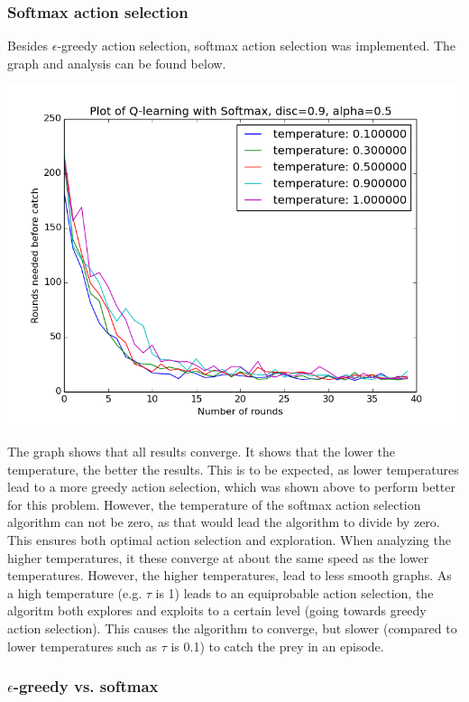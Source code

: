 \documentclass{article}
\begin{document}
\subsubsection{Softmax action selection}
Besides $\epsilon$-greedy action selection, softmax action selection was implemented. The graph and analysis can be found below. 
\begin{center}
	\includegraphics[scale=0.4]{softmax_with_legend}
\end{center}

The graph shows that all results converge. It shows that the lower the temperature, the better the results. This is to be expected, as lower temperatures lead to a more greedy action selection, which was shown above to perform better for this problem. However, the temperature of the softmax action selection algorithm can not be zero, as that would lead the algorithm to divide by zero. This ensures both optimal action selection and exploration. When analyzing the higher temperatures, it these converge at about the same speed as the lower temperatures. However, the higher temperatures, lead to less smooth graphs. As a high temperature (e.g. $\tau$ is 1) leads to an equiprobable action selection, the algoritm both explores and exploits to a certain level (going towards greedy action selection). This causes the algorithm to converge, but slower (compared to lower temperatures such as $\tau$ is 0.1) to catch the prey in an episode.


\subsubsection{$\epsilon$-greedy vs. softmax}
\end{document}
